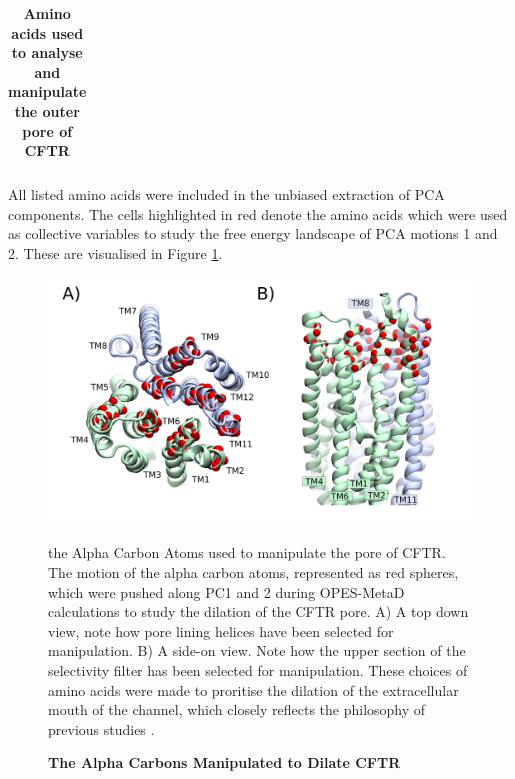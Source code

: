 \begin{table}
\begin{center}
{\begin{tabular} {| c | c | c | c | c | c | c | c | c | c | c | c | }
            



\end{tabular}%
}
\end{center}
\captionsetup{singlelinecheck = false, justification=raggedright}                           
\caption[Amino acids used to analyse and manipulate the outer pore of CFTR] {\textbf{Amino acids used to analyse and manipulate the outer pore of CFTR}}{All listed amino acids were included in the unbiased extraction of PCA components. The cells highlighted in red denote the amino acids which were used as collective variables to study the free energy landscape of PCA motions 1 and 2. These are visualised in Figure \ref{steer_cas_fig}. }

\label{red_alpha_carbons_table}
\end{table}

\begin{figure}
	\begin{center}
		\includegraphics[width=1\textwidth]{figures/opening/steer_cas.pdf}
	\end{center}
	\captionsetup{singlelinecheck = false, justification=raggedright}
	\caption[The Alpha Carbon Atoms Manipulated to Dilate CFTR] {\textbf{The Alpha Carbons Manipulated to Dilate CFTR}}{the Alpha Carbon Atoms used to manipulate the pore of CFTR. The motion of the alpha carbon atoms, represented as red spheres, which were pushed along PC1 and 2 during OPES-MetaD calculations to study the dilation of the CFTR pore. A) A top down view, note how pore lining helices have been selected for manipulation. B) A side-on view. Note how the upper section of the selectivity filter has been selected for manipulation. These choices of amino acids were made to proritise the dilation of the extracellular mouth of the channel, which closely reflects the philosophy of previous studies \cite{hoffman2018}. } 
	\label{steer_cas_fig}
\end{figure}

